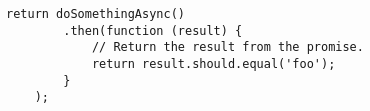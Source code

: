 
\begin{lstlisting}[basicstyle=\basicstyle]
	return doSomethingAsync()
		.then(function (result) {
			// Return the result from the promise.
			return result.should.equal('foo');
		}
	);
\end{lstlisting}
